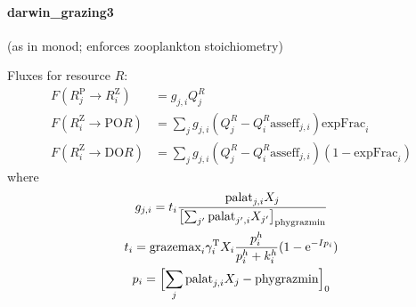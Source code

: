 \documentclass{article}
\def\ee{{\mathrm{e}}}
\def\|#1|{{\text{#1}}}
\begin{document}
\paragraph{darwin\_grazing3} (as in monod; enforces zooplankton stoichiometry)

\noindent
Fluxes for resource $R$:
\begin{align}
  F(R^{\|P|}_j \to R^{\|Z|}_i)
    &= g_{j,i} Q^R_j  \\
  F(R^{\|Z|}_i \to \|PO|R) 
    &= \sum_j g_{j,i} \left( Q^R_j - Q^R_i \|asseff|_{j,i} \right) \|expFrac|_i       \\
  F(R^{\|Z|}_i \to \|DO|R) 
    &= \sum_j g_{j,i} \left( Q^R_j - Q^R_i \|asseff|_{j,i} \right) (1 - \|expFrac|_i)
\end{align}
where
\begin{gather}
  g_{j,i} = t_i \frac{\|palat|_{j,i} X_j}
                     {\bigl[\sum_{j'} \|palat|_{j',i} X_{j'}\bigr]_{\|phygrazmin|}}
\\
  t_i = \|grazemax|_i \gamma^{\|T|}_i X_i 
    \frac{p_i^h}{p_i^h+k^h_i}
    (1 - \ee^{-I p_i})
\\
  p_i = \Bigl[ \sum_j \|palat|_{j,i} X_j - \|phygrazmin| \Bigr]_0
\end{gather}
\end{document}
